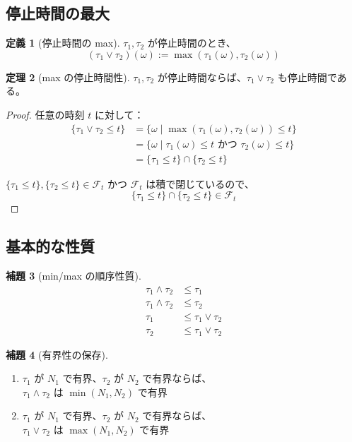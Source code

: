 \documentclass[12pt,a4paper,ja=standard]{bxjsarticle}
\theoremstyle{definition}
\newtheorem{definition}{定義}[section]
\newtheorem{theorem}[definition]{定理}
\newtheorem{lemma}[definition]{補題}
\begin{document}
\subsection{停止時間の最大}

\begin{definition}[停止時間の max]
$\tau_1, \tau_2$ が停止時間のとき、
\[
(\tau_1 \vee \tau_2)(\omega) := \max(\tau_1(\omega), \tau_2(\omega))
\]
\end{definition}

\begin{theorem}[max の停止時間性]
$\tau_1, \tau_2$ が停止時間ならば、$\tau_1 \vee \tau_2$ も停止時間である。
\end{theorem}

\begin{proof}
任意の時刻 $t$ に対して：
\begin{align*}
\{\tau_1 \vee \tau_2 \leq t\} 
&= \{\omega \mid \max(\tau_1(\omega), \tau_2(\omega)) \leq t\} \\
&= \{\omega \mid \tau_1(\omega) \leq t \text{ かつ } \tau_2(\omega) \leq t\} \\
&= \{\tau_1 \leq t\} \cap \{\tau_2 \leq t\}
\end{align*}

$\{\tau_1 \leq t\}, \{\tau_2 \leq t\} \in \mathcal{F}_t$ かつ $\mathcal{F}_t$ は積で閉じているので、
\[
\{\tau_1 \leq t\} \cap \{\tau_2 \leq t\} \in \mathcal{F}_t
\]
\end{proof}

\subsection{基本的な性質}

\begin{lemma}[min/max の順序性質]
\begin{align*}
\tau_1 \wedge \tau_2 &\leq \tau_1 \\
\tau_1 \wedge \tau_2 &\leq \tau_2 \\
\tau_1 &\leq \tau_1 \vee \tau_2 \\
\tau_2 &\leq \tau_1 \vee \tau_2
\end{align*}
\end{lemma}

\begin{lemma}[有界性の保存]
\begin{enumerate}
    \item $\tau_1$ が $N_1$ で有界、$\tau_2$ が $N_2$ で有界ならば、\\
    $\tau_1 \wedge \tau_2$ は $\min(N_1, N_2)$ で有界
    
    \item $\tau_1$ が $N_1$ で有界、$\tau_2$ が $N_2$ で有界ならば、\\
    $\tau_1 \vee \tau_2$ は $\max(N_1, N_2)$ で有界
\end{enumerate}
\end{lemma}
\end{document}
